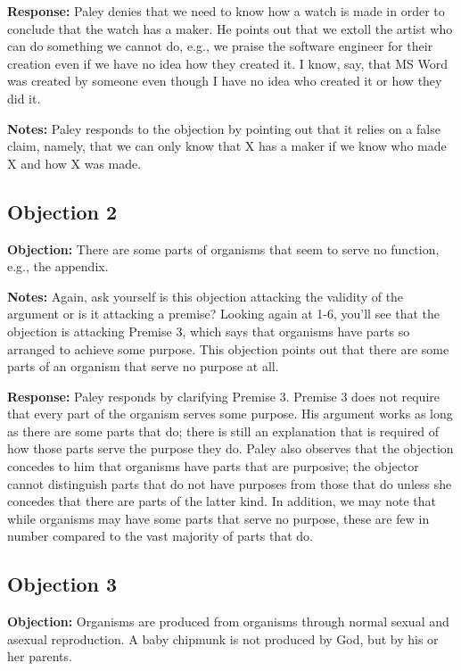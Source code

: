 \documentclass[]{article}
\begin{document}
\textbf{Response:} Paley denies that we need to know how a watch is made
in order to conclude that the watch has a maker. He points out that we
extoll the artist who can do something we cannot do, e.g., we praise the
software engineer for their creation even if we have no idea how they
created it. I know, say, that MS Word was created by someone even though
I have no idea who created it or how they did it.

\textbf{Notes:} Paley responds to the objection by pointing out that it
relies on a false claim, namely, that we can only know that X has a
maker if we know who made X and how X was made.

\subsection{Objection 2}\label{objection-2}

\textbf{Objection:} There are some parts of organisms that seem to serve
no function, e.g., the appendix.

\textbf{Notes:} Again, ask yourself is this objection attacking the
validity of the argument or is it attacking a premise? Looking again at
1-6, you'll see that the objection is attacking Premise 3, which says
that organisms have parts so arranged to achieve some purpose. This
objection points out that there are some parts of an organism that serve
no purpose at all.

\textbf{Response:} Paley responds by clarifying Premise 3. Premise 3
does not require that every part of the organism serves some purpose.
His argument works as long as there are some parts that do; there is
still an explanation that is required of how those parts serve the
purpose they do. Paley also observes that the objection concedes to him
that organisms have parts that are purposive; the objector cannot
distinguish parts that do not have purposes from those that do unless
she concedes that there are parts of the latter kind. In addition, we
may note that while organisms may have some parts that serve no purpose,
these are few in number compared to the vast majority of parts that do.

\subsection{Objection 3}\label{objection-3}

\textbf{Objection:} Organisms are produced from organisms through normal
sexual and asexual reproduction. A baby chipmunk is not produced by God,
but by his or her parents.
\end{document}

